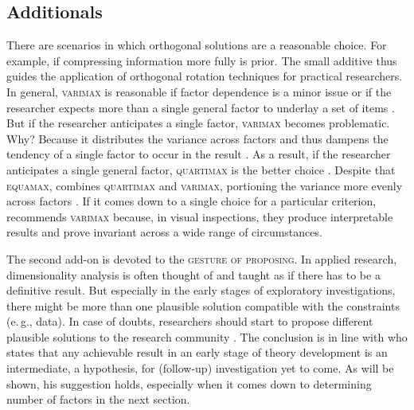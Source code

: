 \documentclass[jou, 11pt]{apa7}
\begin{document}
\subsection{Additionals}

There are scenarios in which orthogonal solutions are a reasonable choice. For
example, if compressing information more fully is prior. The small additive
thus guides the application of orthogonal rotation techniques for practical
researchers. In general, \textsc{varimax} is reasonable if factor dependence is
a minor issue or if the researcher expects more than a single general factor to
underlay a set of items \parencite[p. 195]{Gorsuch2015}. But if the researcher
anticipates a single factor, \textsc{varimax} becomes problematic. Why? Because
it distributes the variance across factors and thus dampens the tendency of a
single factor to occur in the result \parencite{Sass2010}. As a result, if the
researcher anticipates a single general factor, \textsc{quartimax} is the
better choice \parencite{Mair2018}. Despite that \textsc{equamax}, combines
\textsc{quartimax} and \textsc{varimax}, portioning the variance more evenly
across factors \parencite[p. 214]{Gorsuch2015}. If it comes down to a single
choice for a particular criterion, \textcite{Gorsuch2015} recommends
\textsc{varimax} because, in visual inspections, they produce interpretable
results and prove invariant across a wide range of circumstances.

The second add-on is devoted to the \textsc{gesture of proposing}. In applied
research, dimensionality analysis is often thought of and taught as if there
has to be a definitive result. But especially in the early stages of
exploratory investigations, there might be more than one plausible solution
compatible with the constraints (e.\,g., data). In case of doubts, researchers
should start to propose different plausible solutions to the research community
\parencite[for an exception, see][]{Timmerman2017}. The conclusion is in line
with \textcite[p. 224]{Gorsuch2015} who states that any achievable result in an
early stage of theory development is an intermediate, a hypothesis, for
(follow-up) investigation yet to come. As will be shown, his suggestion holds,
especially when it comes down to determining \textit{} number of factors in the
next section.

\printendnotes 
\printbibliography
\end{document}

